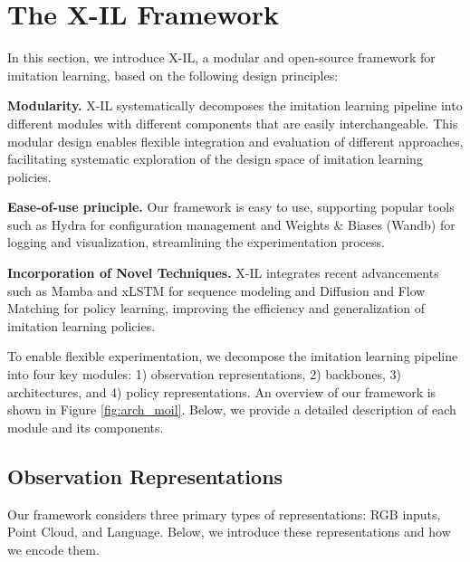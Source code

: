 \section{The X-IL Framework} \label{sec: framework}
In this section, we introduce X-IL, a modular and open-source framework for imitation learning, based on the following design principles:

{\textbf{Modularity.}} X-IL systematically decomposes the imitation learning pipeline into different modules with different components that are easily interchangeable. This modular design enables flexible integration and evaluation of different approaches, facilitating systematic exploration of the design space of imitation learning policies.

{\textbf{Ease-of-use principle.}} Our framework is easy to use, supporting popular tools such as Hydra \cite{Yadan2019Hydra} for configuration management and Weights \& Biases (Wandb) \cite{wandb} for logging and visualization, streamlining the experimentation process.

{\textbf{Incorporation of Novel Techniques.}} X-IL integrates recent advancements such as Mamba \cite{gu2024mambalineartimesequencemodeling} and xLSTM \cite{beck2024xlstmextendedlongshortterm} for sequence modeling and Diffusion and Flow Matching for policy learning, improving the efficiency and generalization of imitation learning policies.

To enable flexible experimentation, we decompose the imitation learning pipeline into four key modules: 1) observation representations, 2) backbones, 3) architectures, and 4) policy representations. An overview of our framework is shown in Figure \ref{fig:arch_moil}. Below, we provide a detailed description of each module and its components.

\subsection{Observation Representations} \label{sec: observation}
Our framework considers three primary types of representations: RGB inputs, Point Cloud, and Language.
Below, we introduce these representations and how we encode them.


